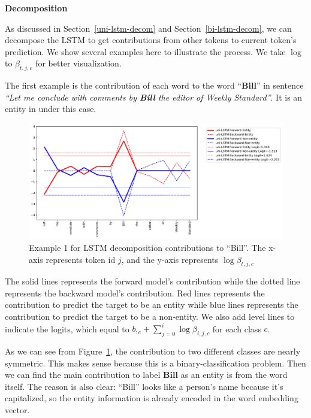 \documentclass{article}
\begin{document}

\noindent \textbf{Decomposition}

As discussed in Section~\ref{uni-lstm-decom} and Section~\ref{bi-lstm-decom}, we can decompose the LSTM to get contributions from other tokens to current token's prediction. We show several examples here to illustrate the process. We take $\log$ to $\beta_{t,j,c}$ for better visualization.

The first example is the contribution of each word to the word ``\textbf{Bill}'' in sentence \textit{``Let me conclude with comments by \textbf{Bill} the editor of Weekly Standard''}. It is an entity in under this case. 
\begin{figure}[t]
	\centering
	\includegraphics[width=\linewidth]{uni-Bill1.pdf}
	\caption{Example 1 for LSTM decomposition contributions to ``Bill''. The x-axis represents token id $j$, and the y-axis represents $\log \beta_{t, j, c}$}
	\label{fig:Bill}
\end{figure}

The solid lines represents the forward model's contribution while the dotted line represents the backward model's contribution.  Red lines represents the contribution to predict the target to be an entity while blue lines represents the contribution to predict the target to be a non-entity. We also add level lines to indicate the logits, which equal to $b_{:c} + \sum_{j=0}^{i} \log \beta_{i, j, c} $ for each class $c$.

As we can see from Figure~\ref{fig:Bill}, the contribution to two different classes are nearly symmetric. This makes sense because this is a binary-classification problem. Then we can find the main contribution to label \textbf{Bill} as an entity is from the word itself. The reason is also clear: ``Bill'' looks like a person's name because it's capitalized, so the entity information is already encoded in the word embedding vector. 
\end{document}
